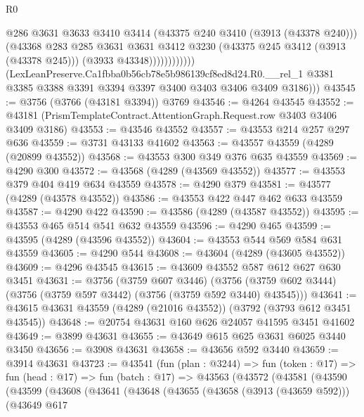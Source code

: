 \begin{lexlean}{R0}
\begin{coremodule}
                            @286
                            @3631
                            @3633
                            @3410
                            @3414
                            (@43375 @240 @3410 (@3913 (@43378 @240)))
                            (@43368
                              @283
                              @285
                              @3631
                              @3631
                              @3412
                              @3230
                              (@43375 @245 @3412 (@3913 (@43378 @245)))
                              (@3933 @43348))))))))))))
        (LexLeanPreserve.Ca1fbba0b56cb78e5b986139cf8ed8d24.R0.__rel_1
          @3381
          @3385
          @3388
          @3391
          @3394
          @3397
          @3400
          @3403
          @3406
          @3409
          @3186)))
@43545 := @3756 (@3766 (@43181 @3394)) @3769
@43546 := @4264 @43545
@43552 := @43181 (PrismTemplateContract.AttentionGraph.Request.row @3403 @3406 @3409 @3186)
@43553 := @43546 @43552
@43557 := @43553 @214 @257 @297 @636
@43559 := @3731 @43133 @41602
@43563 := @43557 @43559 (@4289 (@20899 @43552))
@43568 := @43553 @300 @349 @376 @635 @43559
@43569 := @4290 @300
@43572 := @43568 (@4289 (@43569 @43552))
@43577 := @43553 @379 @404 @419 @634 @43559
@43578 := @4290 @379
@43581 := @43577 (@4289 (@43578 @43552))
@43586 := @43553 @422 @447 @462 @633 @43559
@43587 := @4290 @422
@43590 := @43586 (@4289 (@43587 @43552))
@43595 := @43553 @465 @514 @541 @632 @43559
@43596 := @4290 @465
@43599 := @43595 (@4289 (@43596 @43552))
@43604 := @43553 @544 @569 @584 @631 @43559
@43605 := @4290 @544
@43608 := @43604 (@4289 (@43605 @43552))
@43609 := @4296 @43545
@43615 := @43609 @43552 @587 @612 @627 @630 @3451
@43631 := @3756
    (@3759 @607 @3446)
    (@3756 (@3759 @602 @3444) (@3756 (@3759 @597 @3442) (@3756 (@3759 @592 @3440) @43545)))
@43641 := @43615 @43631 @43559 (@4289 (@21016 @43552)) (@3792 (@3793 @612 @3451 @43545))
@43648 := @20754 @43631 @160 @626 @24057 @41595 @3451 @41602
@43649 := @3899 @43631
@43655 := @43649 @615 @625 @3631 @6025 @3440 @3450
@43656 := @3908 @43631
@43658 := @43656 @592 @3440
@43659 := @3914 @43631
@43723 := @43541
    (fun (plan : @3244) =>
    fun (token : @17) =>
    fun (head : @17) =>
    fun (batch : @17) =>
    @43563
      (@43572
        (@43581
          (@43590
            (@43599
              (@43608
                (@43641
                  (@43648
                    (@43655
                      (@43658 (@3913 (@43659 @592)))
                      (@43649
                        @617

\end{coremodule}
\end{lexlean}
